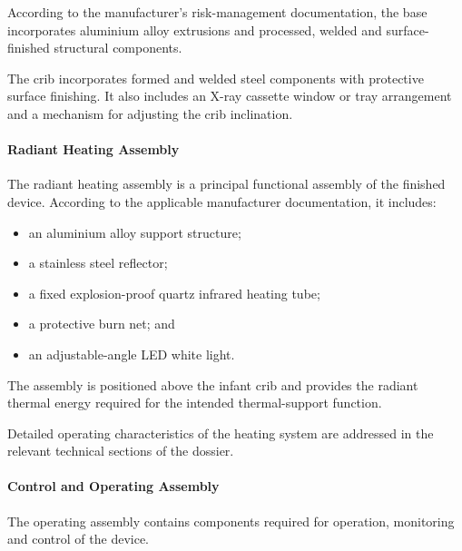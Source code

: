 According to the manufacturer's risk-management documentation, the
base incorporates aluminium alloy extrusions and processed, welded
and surface-finished structural components.

The crib incorporates formed and welded steel components with
protective surface finishing. It also includes an X-ray cassette
window or tray arrangement and a mechanism for adjusting the crib
inclination.


\paragraph{Radiant Heating Assembly}

The radiant heating assembly is a principal functional assembly of
the finished device. According to the applicable manufacturer
documentation, it includes:

\begin{itemize}
    \item an aluminium alloy support structure;
    \item a stainless steel reflector;
    \item a fixed explosion-proof quartz infrared heating tube;
    \item a protective burn net; and
    \item an adjustable-angle LED white light.
\end{itemize}

The assembly is positioned above the infant crib and provides the
radiant thermal energy required for the intended thermal-support
function.

Detailed operating characteristics of the heating system are
addressed in the relevant technical sections of the dossier.


\paragraph{Control and Operating Assembly}

The operating assembly contains components required for operation,
monitoring and control of the device.

